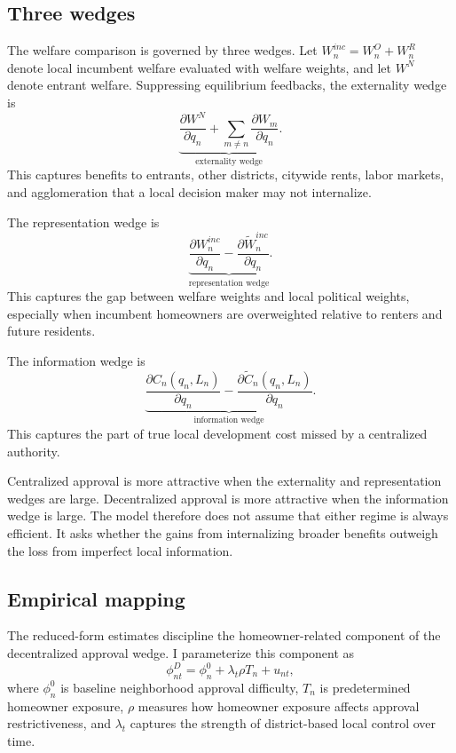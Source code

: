 \subsection{Three wedges}

The welfare comparison is governed by three wedges.
Let \(W_n^{inc}=W_n^O+W_n^R\) denote local incumbent welfare evaluated with welfare weights, and let \(W^N\) denote entrant welfare.
Suppressing equilibrium feedbacks, the externality wedge is
\[
    \underbrace{
    \frac{\partial W^N}{\partial q_n}
    +
    \sum_{m\neq n}
    \frac{\partial W_m}{\partial q_n}
    }_{\text{externality wedge}}.
\]
This captures benefits to entrants, other districts, citywide rents, labor markets, and agglomeration that a local decision maker may not internalize.

The representation wedge is
\[
    \underbrace{
    \frac{\partial W_n^{inc}}{\partial q_n}
    -
    \frac{\partial \widetilde W_n^{inc}}{\partial q_n}
    }_{\text{representation wedge}}.
\]
This captures the gap between welfare weights and local political weights, especially when incumbent homeowners are overweighted relative to renters and future residents.

The information wedge is
\[
    \underbrace{
    \frac{\partial C_n(q_n,L_n)}{\partial q_n}
    -
    \frac{\partial \widetilde C_n(q_n,L_n)}{\partial q_n}
    }_{\text{information wedge}}.
\]
This captures the part of true local development cost missed by a centralized authority.

Centralized approval is more attractive when the externality and representation wedges are large.
Decentralized approval is more attractive when the information wedge is large.
The model therefore does not assume that either regime is always efficient.
It asks whether the gains from internalizing broader benefits outweigh the loss from imperfect local information.

\subsection{Empirical mapping}

The reduced-form estimates discipline the homeowner-related component of the decentralized approval wedge.
I parameterize this component as
\[
    \phi_{nt}^D
    =
    \phi_n^0+
    \lambda_t\rho T_n+
    u_{nt},
\]
where \(\phi_n^0\) is baseline neighborhood approval difficulty, \(T_n\) is predetermined homeowner exposure, \(\rho\) measures how homeowner exposure affects approval restrictiveness, and \(\lambda_t\) captures the strength of district-based local control over time.

